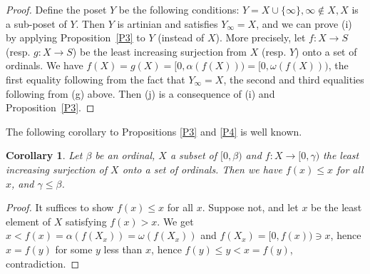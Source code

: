 \documentclass[12pt,letterpaper]{article}
\newtheorem{cor}[thm]{Corollary}
\begin{document}
\begin{proof}
Define the poset $Y$ be the following conditions: $Y=X\cup\{\infty\},\infty\notin X,X$ is a sub-poset of $Y$. Then $Y$ is artinian and satisfies $Y_\infty=X$, and we can prove (i) by applying Proposition~\ref{P3} to $Y$ (instead of $X$). More precisely, let $f:X\to S$ (resp. $g:X\to S$) be the least increasing surjection from $X$ (resp. $Y$) onto a set of ordinals. We have $f(X)=g(X)=[0,\alpha(f(X)))=[0,\omega(f(X)))$, the first equality following from the fact that $Y_\infty=X$, the second and third equalities following from (g) above. %
Then (j) is a consequence of (i) and Proposition~\ref{P3}. 
\end{proof} 

The following corollary to Propositions \ref{P3} and \ref{P4} is well known. 

\begin{cor}
Let $\beta$ be an ordinal, $X$ a subset of $[0,\beta)$ and $f:X\to[0,\gamma)$ the least increasing surjection of $X$ onto a set of ordinals. Then we have $f(x)\le x$ for all $x$, and $\gamma\le\beta$. 
\end{cor} 

\begin{proof}
It suffices to show $f(x)\le x$ for all $x$. Suppose not, and let $x$ be the least element of $X$ satisfying $f(x)>x$. We get $x<f(x)=\alpha(f(X_x))=\omega(f(X_x))$ and $f(X_x)=[0,f(x))\ni x$, hence $x=f(y)$ for some $y$ less than $x$, hence $f(y)\le y<x=f(y)$, contradiction. 
\end{proof} 
\end{document}
